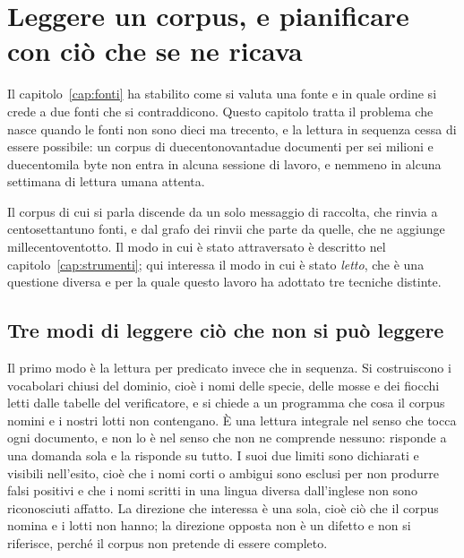 
\chapter{Leggere un corpus, e pianificare con ciò che se ne ricava}
\label{cap:corpus}

Il capitolo~\ref{cap:fonti} ha stabilito come si valuta una fonte e in quale ordine si crede a due fonti che si contraddicono. Questo capitolo tratta il problema che nasce quando le fonti non sono dieci ma trecento, e la lettura in sequenza cessa di essere possibile: un corpus di duecentonovantadue documenti per sei milioni e duecentomila byte non entra in alcuna sessione di lavoro, e nemmeno in alcuna settimana di lettura umana attenta.

Il corpus di cui si parla discende da un solo messaggio di raccolta, che rinvia a centosettantuno fonti, e dal grafo dei rinvii che parte da quelle, che ne aggiunge millecentoventotto. Il modo in cui è stato attraversato è descritto nel capitolo~\ref{cap:strumenti}; qui interessa il modo in cui è stato \emph{letto}, che è una questione diversa e per la quale questo lavoro ha adottato tre tecniche distinte.

\section{Tre modi di leggere ciò che non si può leggere}

Il primo modo è la lettura per predicato invece che in sequenza. Si costruiscono i vocabolari chiusi del dominio, cioè i nomi delle specie, delle mosse e dei fiocchi letti dalle tabelle del verificatore, e si chiede a un programma che cosa il corpus nomini e i nostri lotti non contengano. È una lettura integrale nel senso che tocca ogni documento, e non lo è nel senso che non ne comprende nessuno: risponde a una domanda sola e la risponde su tutto. I suoi due limiti sono dichiarati e visibili nell'esito, cioè che i nomi corti o ambigui sono esclusi per non produrre falsi positivi e che i nomi scritti in una lingua diversa dall'inglese non sono riconosciuti affatto. La direzione che interessa è una sola, cioè ciò che il corpus nomina e i lotti non hanno; la direzione opposta non è un difetto e non si riferisce, perché il corpus non pretende di essere completo.

